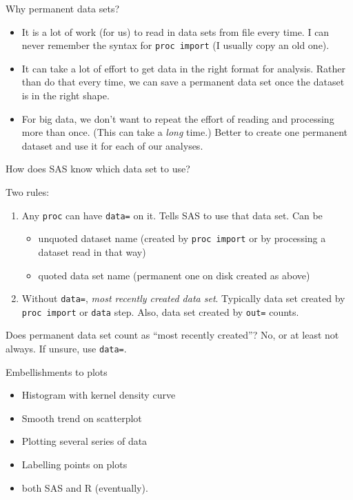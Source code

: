 \documentclass[unknownkeysallowed]{beamer}\usepackage[]{graphicx}\usepackage[]{color}
\begin{document}
\begin{frame}[fragile]{Why permanent data sets?}
  
  \begin{itemize}
  \item It is a lot of work (for us) to read in data sets from file
    every time. I can never remember the syntax for \texttt{proc
      import} (I usually copy an old one).
  \item It can take a lot of effort to get data in the right format
    for analysis. Rather than do that every time, we can save a
    permanent data set once the dataset is in the right shape.
  \item For big data, we don't want to repeat the effort of reading
    and processing more than once. (This can take a \emph{long} time.)
    Better to create one permanent dataset and use it for each of our
    analyses. 
  \end{itemize}
  
\end{frame}

\begin{frame}[fragile]{How does SAS know which data set to use?}

Two rules:

\begin{enumerate}
\item Any \texttt{proc} can have \texttt{data=} on it. Tells SAS to
  use that data set. Can be
  \begin{itemize}
  \item unquoted dataset name (created by \texttt{proc import} or by
    processing a dataset read in that way)
  \item quoted data set name (permanent one on disk created as above)
  \end{itemize}
\item Without \texttt{data=}, \emph{most recently created data
    set}. Typically data set created by \texttt{proc import} or
  \texttt{data} step.  Also, data set created by \texttt{out=} counts.
\end{enumerate}
Does permanent data set count as ``most recently created''? No,
  or at least not always. If unsure, use \texttt{data=}.  
\end{frame}


\begin{frame}[fragile]{Embellishments to plots}
  
  \begin{itemize}
  \item Histogram with kernel density curve
  \item Smooth trend on scatterplot
  \item Plotting several series of data
  \item Labelling points on plots
  \item both SAS and R (eventually).
  \end{itemize}
  
\end{frame}
\end{document}
